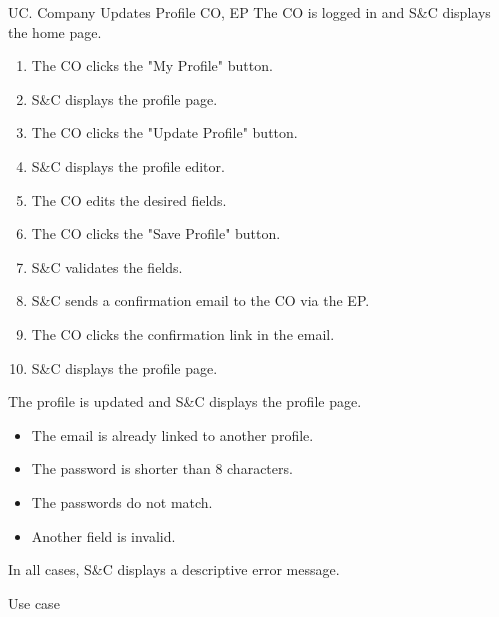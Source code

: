 \clearpage
\begin{usecase}
    {UC\theuc. Company Updates Profile}
    {CO, EP}
    {The CO is logged in and S\&C displays the home page.}
    {\begin{enumerate}[leftmargin=*]
        \item The CO clicks the "My Profile" button.
        \item S\&C displays the profile page.
        \item The CO clicks the "Update Profile" button.
        \item S\&C displays the profile editor.
        \item The CO edits the desired fields.
        \item The CO clicks the "Save Profile" button.
        \item S\&C validates the fields.
        \item S\&C sends a confirmation email to the CO via the EP.
        \item The CO clicks the confirmation link in the email.
        \item S\&C displays the profile page.
    \end{enumerate}}
    {The profile is updated and S\&C displays the profile page.}
    {\begin{itemize}[leftmargin=*, label=\tiny\textbullet]
        \item The email is already linked to another profile.
        \item The password is shorter than 8 characters.
        \item The passwords do not match.
        \item Another field is invalid.
    \end{itemize}
    In all cases, S\&C displays a descriptive error message.}
    {Use case \theuc}
\end{usecase}

